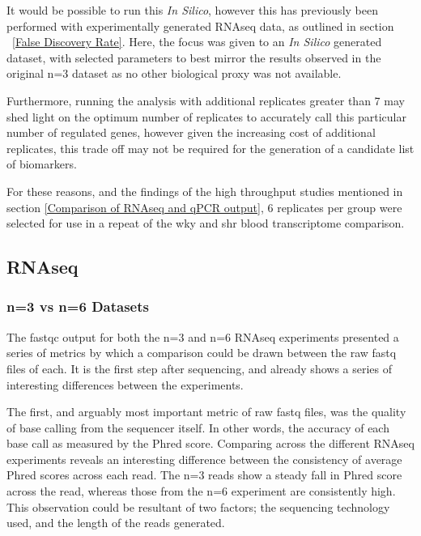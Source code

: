 It would be possible to run this \textit{In Silico}, however this has previously been performed with experimentally generated RNAseq data, as outlined in section ~\ref{False Discovery Rate}. Here, the focus was given to an \textit{In Silico} generated dataset, with selected parameters to best mirror the results observed in the original n=3 dataset as no other biological proxy was not available.

Furthermore, running the analysis with additional replicates greater than 7 may shed light on the optimum number of replicates to accurately call this particular number of regulated genes, however given the increasing cost of additional replicates, this trade off may not be required for the generation of a candidate list of biomarkers.

For these reasons, and the findings of the high throughput studies mentioned in section \ref{Comparison of RNAseq and qPCR output}, 6 replicates per group were selected for use in a repeat of the \acrshort{wky} and \acrshort{shr} blood transcriptome comparison. 

\subsection{RNAseq}

\subsubsection{n=3 vs n=6 Datasets}

The fastqc output for both the n=3 and n=6 RNAseq experiments presented a series of metrics by which a comparison could be drawn between the raw fastq files of each. It is the first step after sequencing, and already shows a series of interesting differences between the experiments. 

The first, and arguably most important metric of raw fastq files, was the quality of base calling from the sequencer itself. In other words, the accuracy of each base call as measured by the Phred score. Comparing across the different RNAseq experiments reveals an interesting difference between the consistency of average Phred scores across each read. The n=3 reads show a steady fall in Phred score across the read, whereas those from the n=6 experiment are consistently high. This observation could be resultant of two factors; the sequencing technology used, and the length of the reads generated. 

